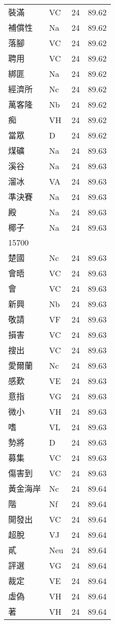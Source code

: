 \documentclass[twocolumn]{book}
\begin{document}
\begin{supertabular}{llrr}
裝滿 & VC & 24 &  89.62\\
補償性 & Na & 24 &  89.62\\
落腳 & VC & 24 &  89.62\\
聘用 & VC & 24 &  89.62\\
綁匪 & Na & 24 &  89.62\\
經濟所 & Nc & 24 &  89.62\\
萬客隆 & Nb & 24 &  89.62\\
痴 & VH & 24 &  89.62\\
當眾 & D & 24 &  89.62\\
煤礦 & Na & 24 &  89.63\\
溪谷 & Na & 24 &  89.63\\
溜冰 & VA & 24 &  89.63\\
準決賽 & Na & 24 &  89.63\\
殿 & Na & 24 &  89.63\\
椰子 & Na & 24 &  89.63\\
15700\\
楚國 & Nc & 24 &  89.63\\
會晤 & VC & 24 &  89.63\\
會 & VC & 24 &  89.63\\
新興 & Nb & 24 &  89.63\\
敬請 & VF & 24 &  89.63\\
損害 & VC & 24 &  89.63\\
搜出 & VC & 24 &  89.63\\
愛爾蘭 & Nc & 24 &  89.63\\
感歎 & VE & 24 &  89.63\\
意指 & VG & 24 &  89.63\\
微小 & VH & 24 &  89.63\\
嗜 & VL & 24 &  89.63\\
勢將 & D & 24 &  89.63\\
募集 & VC & 24 &  89.63\\
傷害到 & VC & 24 &  89.63\\
黃金海岸 & Nc & 24 &  89.64\\
階 & Nf & 24 &  89.64\\
開發出 & VC & 24 &  89.64\\
超脫 & VJ & 24 &  89.64\\
貳 & Neu & 24 &  89.64\\
評選 & VG & 24 &  89.64\\
裁定 & VE & 24 &  89.64\\
虛偽 & VH & 24 &  89.64\\
著 & VH & 24 &  89.64\\

\end{supertabular}
\end{document}
